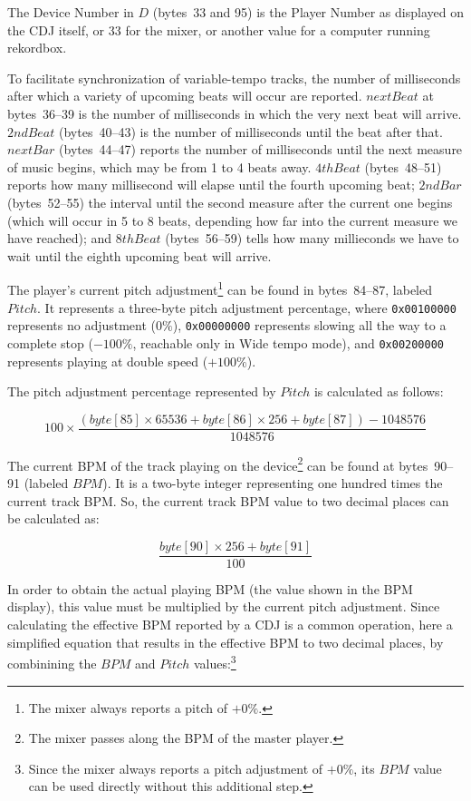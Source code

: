 \documentclass[11pt]{article}
\begin{document}
The Device Number in $D$ (bytes~33 and 95) is the Player Number as
displayed on the CDJ itself, or 33 for the mixer, or another value for
a computer running rekordbox.

To facilitate synchronization of variable-tempo tracks, the number of
milliseconds after which a variety of upcoming beats will occur are
reported. $nextBeat$ at bytes~36--39 is the number of milliseconds in
which the very next beat will arrive. $2ndBeat$ (bytes~40--43) is the
number of milliseconds until the beat after that. $nextBar$
(bytes~44--47) reports the number of milliseconds until the next
measure of music begins, which may be from 1 to 4 beats away.
$4thBeat$ (bytes~48--51) reports how many millisecond will elapse
until the fourth upcoming beat; $2ndBar$ (bytes~52--55) the interval
until the second measure after the current one begins (which will
occur in 5 to 8 beats, depending how far into the current measure we
have reached); and $8thBeat$ (bytes~56--59) tells how many millieconds
we have to wait until the eighth upcoming beat will arrive.

The player's current pitch adjustment\footnote{The mixer always
  reports a pitch of $+0\%$.} can be found in bytes~84--87, labeled
$Pitch$. It represents a three-byte pitch adjustment percentage, where
{\tt 0x00100000} represents no adjustment ($0\%$), {\tt 0x00000000}
represents slowing all the way to a complete stop ($-100\%$, reachable
only in Wide tempo mode), and {\tt 0x00200000} represents playing at
double speed ($+100\%$).

The pitch adjustment percentage represented by $Pitch$ is calculated
as follows:

\begin{displaymath}
  100 \times
  \frac{(byte[85] \times 65536 + byte[86]  \times 256 + byte[87]) - 1048576}{1048576}
\end{displaymath}

The current BPM of the track playing on the device\footnote{The mixer
  passes along the BPM of the master player.} can be found at bytes~90--91
(labeled $BPM$). It is a two-byte integer representing one hundred
times the current track BPM. So, the current track BPM value to two
decimal places can be calculated as:

\[ \frac{byte[90] \times 256 + byte[91]}{100} \]

In order to obtain the actual playing BPM (the value shown in the BPM
display), this value must be multiplied by the current pitch
adjustment. Since calculating the effective BPM reported by a CDJ is a
common operation, here a simplified equation that results in the
effective BPM to two decimal places, by combinining the $BPM$ and
$Pitch$ values:\footnote{Since the mixer always reports a pitch
  adjustment of $+0\%$, its $BPM$ value can be used directly without
  this additional step.}
\end{document}
